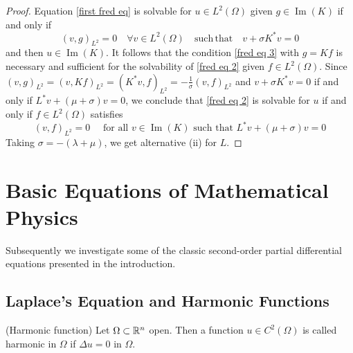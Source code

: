 \documentclass[11pt]{article}
\begin{document}
\begin{proof}
                Equation \eqref{first fred eq} is solvable for \(u \in L^{2}(\Omega)\) given \(g \in \operatorname{Im} (K)\) if and only if
                \begin{equation}\label{fred eq 3}
                    (v, g)_{L^{2}}=0 \quad \forall v \in L^{2}(\Omega) \quad \mathrm{such \,that} \quad v+\sigma K^{*} v=0
                \end{equation}
                and then \(u \in \operatorname{Im} (K) .\) It follows that the condition \eqref{fred eq 3} with \(g=K f\) is necessary
                and sufficient for the solvability of \eqref{fred eq 2} given \(f \in L^{2}(\Omega) .\) Since
                \((v, g)_{L^{2}}=(v, K f)_{L^{2}}=\left(K^{*} v, f\right)_{L^{2}}=-\frac{1}{\sigma}(v, f)_{L^{2}}\)
                and \(v+\sigma K^{*} v=0\) if and only if \(L^{*} v+(\mu+\sigma) v=0\), we conclude that \eqref{fred eq 2} is
                solvable for \(u\) if and only if \(f \in L^{2}(\Omega)\) satisfies
                $$
                (v, f)_{L^{2}}=0 \quad \text { for all } v \in \operatorname{Im} (K) \text { such that } L^{*} v+(\mu+\sigma) v=0
                $$
                Taking \(\sigma=-(\lambda+\mu)\), we get alternative (ii) for \(L\).
            \end{proof}


	\section{Basic Equations of Mathematical Physics}

		Subsequently we investigate some of the classic second-order partial differential equations presented in the introduction.

		\subsection{Laplace's Equation and Harmonic Functions}

			\begin{defi}(Harmonic function)
				Let $\Omega\subset\mathbb{R}^n$ open. Then a function $u\in C^2(\Omega)$ is called harmonic in $\Omega$ if $\Delta u=0$ in $\Omega$.
			\end{defi}
\end{document}
